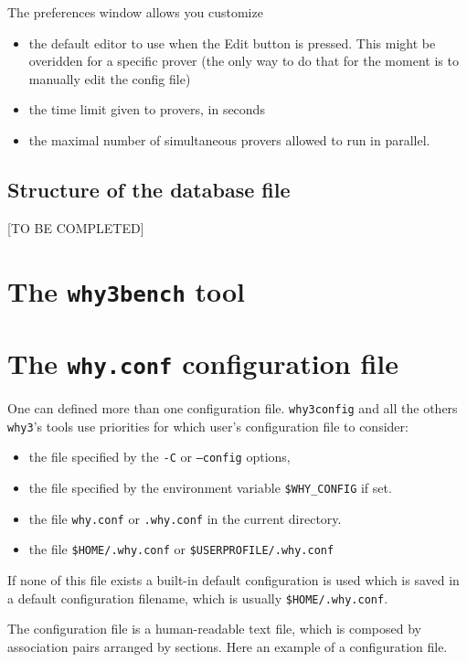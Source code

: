 The preferences window allows you customize
\begin{itemize}
\item the default editor to use when the \textsf{Edit} button is
  pressed. This might be overidden for a specific prover (the only way
  to do that for the moment is to manually edit the config file)
\item the time limit given to provers, in seconds
\item the maximal number of simultaneous provers allowed to run in parallel. 
\end{itemize}


\subsection{Structure of the database file}

[TO BE COMPLETED]

\section{The \texttt{why3bench} tool}

\section{The \texttt{why.conf} configuration file}
\label{sec:whyconffile}
One can defined more than one configuration file. \texttt{why3config}
and all the others \texttt{why3}'s tools use priorities for which
user's configuration file to consider:
\begin{itemize}
\item the file specified by the \texttt{-C} or \texttt{--config} options,
\item the file specified by the environment variable
  \texttt{\$WHY\_CONFIG} if set.
\item the file \texttt{why.conf} or \texttt{.why.conf} in the current
  directory.
\item the file \texttt{\$HOME/.why.conf} or \texttt{\$USERPROFILE/.why.conf}
\end{itemize}
If none of this file exists a built-in default configuration is used
which is saved in a default configuration filename, which is usually
\texttt{\$HOME/.why.conf}.

The configuration file is a human-readable text file, which is
composed by association pairs arranged by sections. Here an example of
a configuration file.

